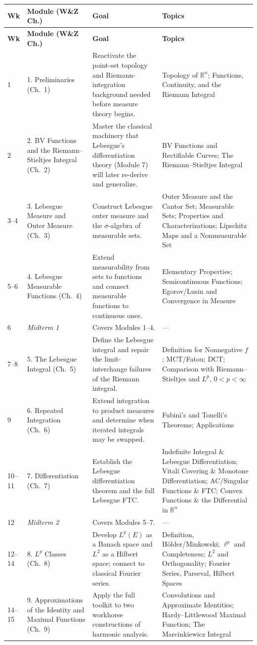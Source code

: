 \documentclass[11pt]{article}
\begin{document}
\begin{longtable}{@{}p{0.9cm} p{3.1cm} p{5.1cm} p{5.3cm}@{}}
\toprule
\textbf{Wk} & \textbf{Module (W\&Z Ch.)} & \textbf{Goal} & \textbf{Topics} \\
\midrule
\endfirsthead
\toprule
\textbf{Wk} & \textbf{Module (W\&Z Ch.)} & \textbf{Goal} & \textbf{Topics} \\
\midrule
\endhead
1 & 1. Preliminaries (Ch.\ 1) & Reactivate the point-set topology and Riemann-integration background needed before measure theory begins. & Topology of $\mathbb{R}^n$; Functions, Continuity, and the Riemann Integral \\
2 & 2. BV Functions and the Riemann--Stieltjes Integral (Ch.\ 2) & Master the classical machinery that Lebesgue's differentiation theory (Module 7) will later re-derive and generalize. & BV Functions and Rectifiable Curves; The Riemann--Stieltjes Integral \\
3--4 & 3. Lebesgue Measure and Outer Measure (Ch.\ 3) & Construct Lebesgue outer measure and the $\sigma$-algebra of measurable sets. & Outer Measure and the Cantor Set; Measurable Sets; Properties and Characterizations; Lipschitz Maps and a Nonmeasurable Set \\
5--6 & 4. Lebesgue Measurable Functions (Ch.\ 4) & Extend measurability from sets to functions and connect measurable functions to continuous ones. & Elementary Properties; Semicontinuous Functions; Egorov/Lusin and Convergence in Measure \\
6 & \textit{Midterm 1} & Covers Modules 1--4. & --- \\
7--8 & 5. The Lebesgue Integral (Ch.\ 5) & Define the Lebesgue integral and repair the limit-interchange failures of the Riemann integral. & Definition for Nonnegative $f$; MCT/Fatou; DCT; Comparison with Riemann--Stieltjes and $L^p$, $0<p<\infty$ \\
9 & 6. Repeated Integration (Ch.\ 6) & Extend integration to product measures and determine when iterated integrals may be swapped. & Fubini's and Tonelli's Theorems; Applications \\
10--11 & 7. Differentiation (Ch.\ 7) & Establish the Lebesgue differentiation theorem and the full Lebesgue FTC. & Indefinite Integral \& Lebesgue Differentiation; Vitali Covering \& Monotone Differentiation; AC/Singular Functions \& FTC; Convex Functions \& the Differential in $\mathbb{R}^n$ \\
12 & \textit{Midterm 2} & Covers Modules 5--7. & --- \\
12--14 & 8. $L^p$ Classes (Ch.\ 8) & Develop $L^p(E)$ as a Banach space and $L^2$ as a Hilbert space; connect to classical Fourier series. & Definition, H\"older/Minkowski; $\ell^p$ and Completeness; $L^2$ and Orthogonality; Fourier Series, Parseval, Hilbert Spaces \\
14--15 & 9. Approximations of the Identity and Maximal Functions (Ch.\ 9) & Apply the full toolkit to two workhorse constructions of harmonic analysis. & Convolutions and Approximate Identities; Hardy--Littlewood Maximal Function; The Marcinkiewicz Integral \\
\bottomrule
\end{longtable}
\end{document}
